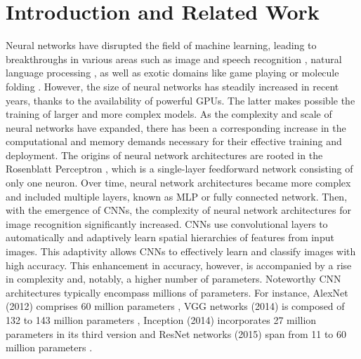 \section{Introduction and Related Work}
Neural networks have disrupted the field of machine learning, leading to
breakthroughs in various areas such as image and speech recognition
\cite{DBLP:conf/nips/KrizhevskySH12,DBLP:journals/corr/SimonyanZ14a,DBLP:conf/cvpr/HeZRS16,DBLP:journals/corr/HannunCCCDEPSSCN14,DBLP:conf/icassp/ChanJLV16,DBLP:conf/icml/AmodeiABCCCCCCD16},
natural language processing
\cite{DBLP:conf/emnlp/BudzianowskiV19,DBLP:conf/naacl/DevlinCLT19,DBLP:conf/nips/VaswaniSPUJGKP17},
as well as exotic domains like game playing
\cite{silver2016mastering,silver2018general} or molecule folding
\cite{jumper2021highly}. However, the size of neural networks has steadily
increased in recent years, thanks to the availability of powerful \acp{GPU}. The
latter makes possible the training of larger and more complex models. As the
complexity and scale of neural networks have expanded, there has been a
corresponding increase in the computational and memory demands necessary for
their effective training and deployment. The origins of neural network
architectures are rooted in the Rosenblatt Perceptron
\cite{rosenblatt1958perceptron}, which is a single-layer feedforward network
consisting of only one neuron. Over time, neural network architectures became
more complex and included multiple layers, known as \ac{MLP} or fully connected
network. Then, with the emergence of \acp{CNN}, the
complexity of neural network architectures for image recognition significantly
increased. \acp{CNN} use convolutional layers to automatically and adaptively
learn spatial hierarchies of features from input images. This adaptivity allows
\acp{CNN} to effectively learn and classify images with high accuracy. This
enhancement in accuracy, however, is accompanied by a rise in complexity and,
notably, a higher number of parameters. Noteworthy \ac{CNN} architectures
typically encompass millions of parameters. For instance, AlexNet (2012)
comprises 60 million parameters \cite{DBLP:conf/nips/KrizhevskySH12}, VGG
networks (2014) is composed of 132 to 143 million parameters
\cite{DBLP:journals/corr/SimonyanZ14a}, Inception (2014) incorporates 27 million
parameters in its third version \cite{DBLP:conf/cvpr/SzegedyLJSRAEVR15} and
ResNet networks (2015) span from 11 to 60 million parameters
\cite{DBLP:conf/cvpr/HeZRS16}.\\

